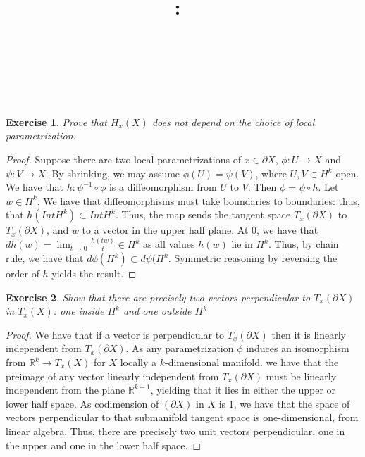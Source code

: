 \documentclass{article}
\title{
    \vspace{2in}
    \textmd{\textbf{\hmwkClass:\ \hmwkTitle}}\\
    \vspace{0.1in}
    \textmd{\hmwkDueDate} \\
    \vspace{0.2in}\large{\textit{\hmwkClassInstructor\  }}
    \vspace{2in}
}
\author{\hmwkAuthorName}
\date{}
\newtheorem{exercise}{Exercise}
\begin{document}
\maketitle

\pagebreak

\begin{exercise}
  Prove that $H_{x}(X)$ does not depend on the choice of local parametrization.
  \end{exercise}
  \begin{proof}
    Suppose there are two local parametrizations of $x \in \partial X$, $\phi: U \to X$ and $\psi: V \to X$. By shrinking, we may assume $\phi(U) = \psi(V)$, where $U, V \subset H^{k}$ open. We have that $h: \psi^{-1} \circ \phi$ is a diffeomorphism from $U$ to $V$. Then $\phi = \psi \circ h$. Let $w \in H^{k}$. We have that diffeomorphisms must take boundaries to boundaries: thus, that $h(IntH^{k}) \subset IntH^{k}$. Thus, the map sends the tangent space $T_{x}(\partial X)$ to $T_{x}(\partial X)$, and $w$ to a vector in the upper half plane. At 0, we have that $dh(w) = \lim_{t \to 0}\frac{h(tw)}{t} \in H^{k}$ as all values $h(w)$ lie in $H^{k}$. Thus, by chain rule, we have that $d\phi(H^{k}) \subset d\psi(H^{k}$. Symmetric reasoning by reversing the order of $h$ yields the result.  
  \end{proof}
 

  \begin{exercise}
    Show that there are precisely two vectors perpendicular to $T_{x}(\partial X)$ in $T_{x}(X)$: one inside $H^{k}$ and one outside $H^{k}$
  \end{exercise}

  \begin{proof}
    We have that if a vector is perpendicular to $T_{x}(\partial X)$ then it is linearly independent from $T_{x}(\partial X)$. As any parametrization $\phi$ induces an isomorphism from $\mathbb{R}^{k} \to T_{x}(X)$ for $X$ locally a $k$-dimensional manifold. we have that the preimage of any vector linearly independent from $T_{x}(\partial X)$ must be linearly independent from the plane $\mathbb{R}^{k-1}$, yielding that it lies in either the upper or lower half space. As codimension of $(\partial X)$ in $X$ is 1, we have that the space of vectors perpendicular to that submanifold tangent space is one-dimensional, from linear algebra. Thus, there are precisely two unit vectors perpendicular, one in the upper and one in the lower half space. 
  \end{proof}
\end{document}
